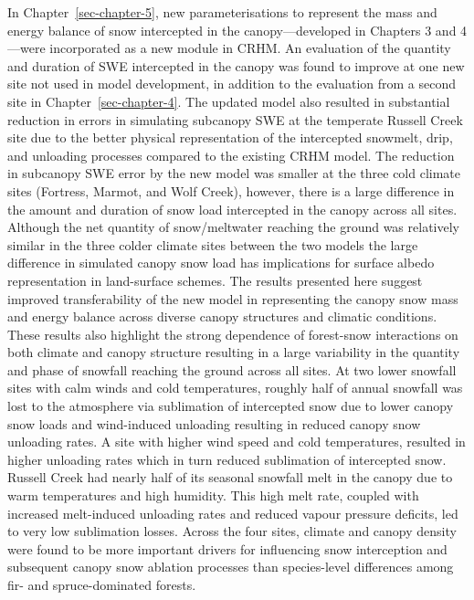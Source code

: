 \documentclass[
  letterpaper,
]{tex/uofsthesis-cs}
\begin{document}
In Chapter~\ref{sec-chapter-5}, new parameterisations to represent the
mass and energy balance of snow intercepted in the canopy---developed in
Chapters 3 and 4---were incorporated as a new module in CRHM. An
evaluation of the quantity and duration of SWE intercepted in the canopy
was found to improve at one new site not used in model development, in
addition to the evaluation from a second site in
Chapter~\ref{sec-chapter-4}. The updated model also resulted in
substantial reduction in errors in simulating subcanopy SWE at the
temperate Russell Creek site due to the better physical representation
of the intercepted snowmelt, drip, and unloading processes compared to
the existing CRHM model. The reduction in subcanopy SWE error by the new
model was smaller at the three cold climate sites (Fortress, Marmot, and
Wolf Creek), however, there is a large difference in the amount and
duration of snow load intercepted in the canopy across all sites.
Although the net quantity of snow/meltwater reaching the ground was
relatively similar in the three colder climate sites between the two
models the large difference in simulated canopy snow load has
implications for surface albedo representation in land-surface schemes.
The results presented here suggest improved transferability of the new
model in representing the canopy snow mass and energy balance across
diverse canopy structures and climatic conditions. These results also
highlight the strong dependence of forest-snow interactions on both
climate and canopy structure resulting in a large variability in the
quantity and phase of snowfall reaching the ground across all sites. At
two lower snowfall sites with calm winds and cold temperatures, roughly
half of annual snowfall was lost to the atmosphere via sublimation of
intercepted snow due to lower canopy snow loads and wind-induced
unloading resulting in reduced canopy snow unloading rates. A site with
higher wind speed and cold temperatures, resulted in higher unloading
rates which in turn reduced sublimation of intercepted snow. Russell
Creek had nearly half of its seasonal snowfall melt in the canopy due to
warm temperatures and high humidity. This high melt rate, coupled with
increased melt-induced unloading rates and reduced vapour pressure
deficits, led to very low sublimation losses. Across the four sites,
climate and canopy density were found to be more important drivers for
influencing snow interception and subsequent canopy snow ablation
processes than species-level differences among fir- and spruce-dominated
forests.
\end{document}
